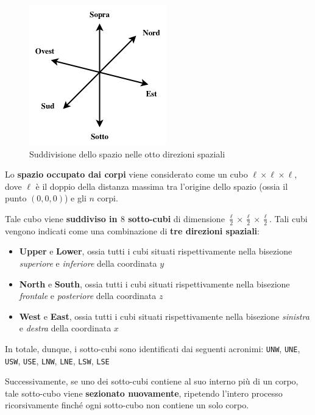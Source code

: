 \documentclass[12pt]{report}
\begin{document}
    \begin{figure}[H]
        \centering
        \includegraphics[scale=0.7]{images/plane.png}
        \caption{Suddivisione dello spazio nelle otto direzioni spaziali}
        \label{fig:plane}
    \end{figure}

    Lo \textbf{spazio occupato dai corpi} viene considerato come un cubo $\ell \times \ell \times \ell$, dove $\ell$ è il doppio della distanza massima tra l'origine dello spazio (ossia il punto $(0,0,0)$) e gli $n$ corpi.

    Tale cubo viene \textbf{suddiviso in $8$ sotto-cubi} di dimensione $\frac{\ell}{2} \times \frac{\ell}{2} \times \frac{\ell}{2}$. Tali cubi vengono indicati come una combinazione di \textbf{tre direzioni spaziali}:
    \begin{itemize}
        \item \textbf{Upper} e \textbf{Lower}, ossia tutti i cubi situati rispettivamente nella bisezione \textit{superiore} e \textit{inferiore} della coordinata $y$
        \item \textbf{North} e \textbf{South}, ossia tutti i cubi situati rispettivamente nella bisezione \textit{frontale} e \textit{posteriore} della coordinata $z$
        \item \textbf{West} e \textbf{East}, ossia tutti i cubi situati rispettivamente nella bisezione \textit{sinistra} e \textit{destra} della coordinata $x$
    \end{itemize}

    In totale, dunque, i sotto-cubi sono identificati dai seguenti acronimi:
    \texttt{UNW}, \texttt{UNE}, \texttt{USW}, \texttt{USE}, \texttt{LNW}, \texttt{LNE}, \texttt{LSW}, \texttt{LSE}

    Successivamente, se uno dei sotto-cubi contiene al suo interno più di un corpo, tale sotto-cubo viene \textbf{sezionato nuovamente}, ripetendo l'intero processo ricorsivamente finché ogni sotto-cubo non contiene un solo corpo.
\end{document}
